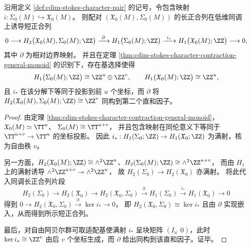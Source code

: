 
\begin{proposition}\label{prop:cdim-stokes-homology-exact-splitting}
沿用定义 \ref{def:cdim-stokes-character-pair} 的记号，令包含映射 \(i:\Sigma_0(M)\hookrightarrow \mathfrak X_0(M)\)。
则配对 \((\mathfrak X_0(M),\Sigma_0(M))\) 的长正合列在低维同调上诱导短正合列
\[
0\longrightarrow H_{2}\bigl(\mathfrak X_0(M),\Sigma_0(M);\ZZ\bigr)
\xrightarrow{\ \partial\ }
H_{1}\bigl(\Sigma_0(M);\ZZ\bigr)
\xrightarrow{\ i_\ast\ }
H_{1}\bigl(\mathfrak X_0(M);\ZZ\bigr)
\longrightarrow 0,
\]
其中 \(\partial\) 为相对边界映射。
并且在定理 \ref{thm:cdim-stokes-character-contraction-general-monoid} 的识别下，存在基选择使得
\[
H_{1}\bigl(\Sigma_0(M);\ZZ\bigr)\cong \ZZ^{u}\oplus \ZZ^{v},\qquad
H_{1}\bigl(\mathfrak X_0(M);\ZZ\bigr)\cong \ZZ^{u},
\]
且 \(i_\ast\) 在该分解下等同于投影到前 \(u\) 个坐标，而 \(\partial\) 将
\(
H_{2}(\mathfrak X_0(M),\Sigma_0(M);\ZZ)\cong \ZZ^{v}
\)
同构到第二个直和因子。
\end{proposition}
\begin{proof}
由定理 \ref{thm:cdim-stokes-character-contraction-general-monoid}，
\(
\mathfrak X_0(M)\simeq \TT^{u}
\)、
\(
\Sigma_0(M)\cong \TT^{u+v}
\)，
并且包含映射在同伦意义下等同于 \(\TT^{u+v}\to \TT^{u}\) 的坐标投影。
因此 \(i_\ast:H_1(\Sigma_0;\ZZ)\to H_1(\mathfrak X_0;\ZZ)\) 为满射，核为自由秩 \(v\)。
\par
另一方面，\(H_2(\mathfrak X_0(M);\ZZ)\cong \wedge^2\ZZ^{u}\)、\(H_2(\Sigma_0(M);\ZZ)\cong \wedge^2\ZZ^{u+v}\)，
而由 \(H_1\) 上的满射诱导 \(\wedge^2\ZZ^{u+v}\twoheadrightarrow \wedge^2\ZZ^{u}\)，
故 \(H_2(\Sigma_0)\to H_2(\mathfrak X_0)\) 亦满射。
将此代入同调长正合列片段
\[
H_2(\Sigma_0)\to H_2(\mathfrak X_0)\to H_2(\mathfrak X_0,\Sigma_0)\xrightarrow{\partial}H_1(\Sigma_0)\xrightarrow{i_\ast}H_1(\mathfrak X_0)\to 0
\]
得到
\(
0\to H_2(\mathfrak X_0,\Sigma_0)\xrightarrow{\partial}\ker i_\ast\to 0
\)，
即 \(H_2(\mathfrak X_0,\Sigma_0)\cong \ker i_\ast\) 且由 \(\partial\) 实现嵌入，从而得到所示短正合列。
\par
最后，对自由阿贝尔群可取适配基使满射 \(i_\ast\) 呈块矩阵 \((I_u\ \ 0)\)，此时 \(\ker i_\ast\cong \ZZ^{v}\) 由后 \(v\) 个坐标生成，而 \(\partial\) 给出同构到该直和因子。证毕。
\end{proof}

\endinput
